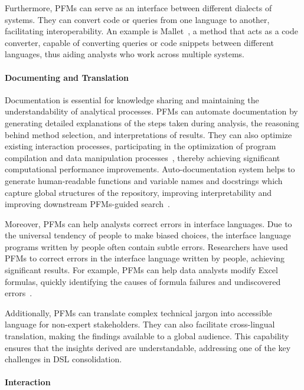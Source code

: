 Furthermore, PFMs can serve as an interface between different dialects of systems. They can convert code or queries from one language to another, facilitating interoperability. An example is Mallet~\cite{ngom2024mallet}, a method that acts as a code converter, capable of converting queries or code snippets between different languages, thus aiding analysts who work across multiple systems.

\paragraph{Documenting and Translation}

Documentation is essential for knowledge sharing and maintaining the understandability of analytical processes. PFMs can automate documentation by generating detailed explanations of the steps taken during analysis, the reasoning behind method selection, and interpretations of results. They can also optimize existing interaction processes, participating in the optimization of program compilation and data manipulation processes~\cite{cummins2023large, cummins2024meta, li2024can}, thereby achieving significant computational performance improvements. Auto-documentation system helps to generate human-readable functions and variable names and docstrings which capture global structures of the repository, improving interpretability and improving downstream PFMs-guided search~\cite{GrandWBOLTA24}.

Moreover, PFMs can help analysts correct errors in interface languages. Due to the universal tendency of people to make biased choices, the interface language programs written by people often contain subtle errors. Researchers have used PFMs to correct errors in the interface language written by people, achieving significant results. For example, PFMs can help data analysts modify Excel formulas, quickly identifying the causes of formula failures and undiscovered errors~\cite{Bavishi2022NeurosymbolicRF}.

Additionally, PFMs can translate complex technical jargon into accessible language for non-expert stakeholders. They can also facilitate cross-lingual translation, making the findings available to a global audience. This capability ensures that the insights derived are understandable, addressing one of the key challenges in DSL consolidation.

\paragraph{Interaction}

